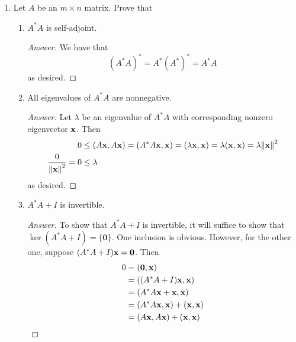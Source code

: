 \documentclass[../psets.tex]{subfiles}
\begin{document}
\begin{enumerate}[label={\textbf{2.\arabic*.}}]
\begin{enumerate}
\begin{proof}[Answer]
            Suppose $A=A^*$. Then
            \begin{equation*}
                (A^k)^* = (\underbrace{A\cdots A}_{k\text{ times}})^*
                = \underbrace{A^*\cdots A^*}_{k\text{ times}}
                = \underbrace{A\cdots A}_{k\text{ times}}
                = A^k
            \end{equation*}
            as desired.
        \end{proof}
    \end{enumerate}
    \item Let $A$ be an $m\times n$ matrix. Prove that
    \begin{enumerate}
        \item $A^*A$ is self-adjoint.
        \begin{proof}[Answer]
            We have that
            \begin{equation*}
                (A^*A)^* = A^*(A^*)^*=A^*A
            \end{equation*}
            as desired.
        \end{proof}
        \item All eigenvalues of $A^*A$ are nonnegative.
        \begin{proof}[Answer]
            Let $\lambda$ be an eigenvalue of $A^*A$ with corresponding nonzero eigenvector $\mathbf{x}$. Then
            \begin{align*}
                0 &\leq (A\mathbf{x},A\mathbf{x})
                = (A^*A\mathbf{x},\mathbf{x})
                = (\lambda\mathbf{x},\mathbf{x})
                = \lambda(\mathbf{x},\mathbf{x})
                = \lambda\norm{\mathbf{x}}^2\\
                \frac{0}{\norm{\mathbf{x}}^2} = 0 &\leq \lambda
            \end{align*}
            as desired.
        \end{proof}
        \item $A^*A+I$ is invertible.
        \begin{proof}[Answer]
            To show that $A^*A+I$ is invertible, it will suffice to show that $\ker(A^*A+I)=\{\bm{0}\}$. One inclusion is obvious. However, for the other one, suppose $(A^*A+I)\mathbf{x}=\bm{0}$. Then
            \begin{align*}
                0 &= (\bm{0},\x)\\
                &= ((A^*A+I)\x,\x)\\
                &= (A^*A\x+\x,\x)\\
                &= (A^*A\x,\x)+(\x,\x)\\
                &= (A\x,A\x)+(\x,\x)\\

\end{align*}
\end{proof}
\end{enumerate}
\end{enumerate}
\end{document}

